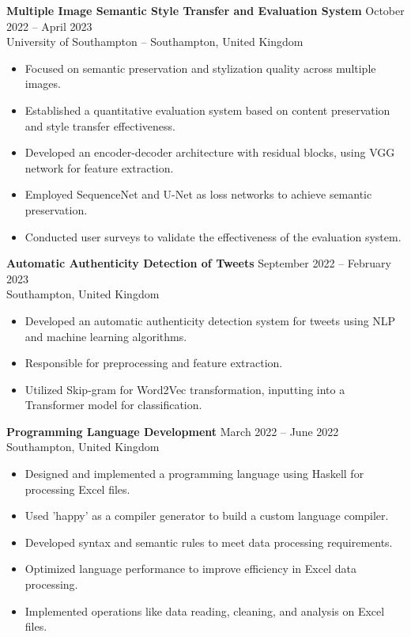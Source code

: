 \documentclass[a4paper,10pt]{article}
\begin{document}
\textbf{Multiple Image Semantic Style Transfer and Evaluation System} \hfill October 2022 – April 2023 \\
University of Southampton – Southampton, United Kingdom
\begin{itemize}[noitemsep,topsep=0pt]
    \item Focused on semantic preservation and stylization quality across multiple images.
    \item Established a quantitative evaluation system based on content preservation and style transfer effectiveness.
    \item Developed an encoder-decoder architecture with residual blocks, using VGG network for feature extraction.
    \item Employed SequenceNet and U-Net as loss networks to achieve semantic preservation.
    \item Conducted user surveys to validate the effectiveness of the evaluation system.
\end{itemize}

\textbf{Automatic Authenticity Detection of Tweets} \hfill September 2022 – February 2023 \\
Southampton, United Kingdom
\begin{itemize}[noitemsep,topsep=0pt]
    \item Developed an automatic authenticity detection system for tweets using NLP and machine learning algorithms.
    \item Responsible for preprocessing and feature extraction.
    \item Utilized Skip-gram for Word2Vec transformation, inputting into a Transformer model for classification.
\end{itemize}

\textbf{Programming Language Development} \hfill March 2022 – June 2022 \\
Southampton, United Kingdom
\begin{itemize}[noitemsep,topsep=0pt]
    \item Designed and implemented a programming language using Haskell for processing Excel files.
    \item Used 'happy' as a compiler generator to build a custom language compiler.
    \item Developed syntax and semantic rules to meet data processing requirements.
    \item Optimized language performance to improve efficiency in Excel data processing.
    \item Implemented operations like data reading, cleaning, and analysis on Excel files.
\end{itemize}
\end{document}
